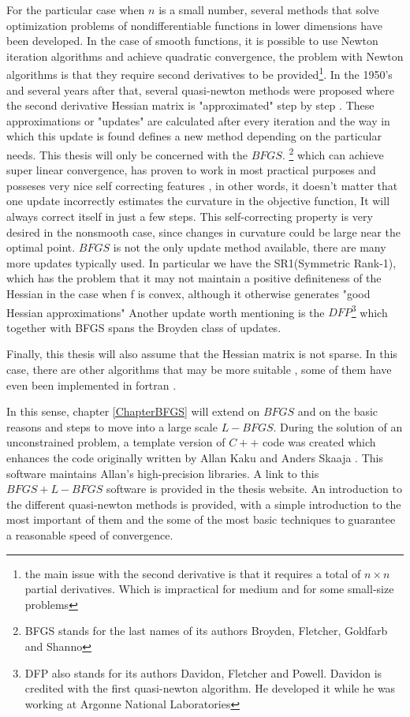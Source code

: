 For the particular case when $n$ is a small number, several methods that solve optimization problems of nondifferentiable functions in lower dimensions \citep{kiwiel85} have been developed.  In the case of smooth functions, it is possible to use Newton iteration algorithms and achieve quadratic convergence, the problem with Newton algorithms is that they require second derivatives to be provided\footnote{the main issue with the second derivative is that it requires a total of $n \times n$ partial derivatives.  Which is impractical for medium and for some small-size problems}.  In the 1950's and several years after that, several quasi-newton methods were proposed where the second derivative Hessian matrix is "approximated" step by step \citep{unconstrained}.  These approximations or "updates" are calculated after every iteration and the way in which this update is found defines a new method depending on the particular needs.  This thesis will only be concerned with the $BFGS$.  \footnote{BFGS stands for the last names of its authors Broyden, Fletcher, Goldfarb and Shanno} which can achieve super linear convergence, has proven to work in most practical purposes and posseses very nice self correcting features \citep{selfcorrecting}, in other words, it doesn't matter that one update incorrectly estimates the curvature in the objective function,  It will always correct itself in just a few steps.  This self-correcting property is very desired in the nonsmooth case, since changes in curvature could be large near the optimal point.   $BFGS$ is not the only update method available, there are many more updates typically used.  In particular we have the SR1(Symmetric Rank-1), which has the problem that it may not maintain a positive definiteness of the Hessian in the case when f is convex, although it otherwise generates "good Hessian approximations"\citep{nocedal} Another update worth mentioning is the $DFP$\footnote{DFP also stands for its authors Davidon, Fletcher and Powell.  Davidon is credited with the first quasi-newton algorithm.  He developed it while he was working at Argonne National Laboratories} which together with BFGS spans the Broyden class of updates.

Finally, this thesis will also assume that the Hessian matrix is not sparse.  In this case, there are other algorithms that may be more suitable \citep{Fletcher96computingsparse, sparse}, some of them have even been implemented in fortran \citep{lancelot}.

In this sense, chapter \ref{ChapterBFGS} will extend on $BFGS$ and on the basic reasons and steps to move into a large scale $L-BFGS$.  During the solution of an unconstrained problem, a template version of $C++$ code was created which enhances the code originally written by Allan Kaku and Anders Skaaja \citep{kaku}.  This software maintains Allan's high-precision libraries.  A link to this $BFGS+L-BFGS$ software is provided in the thesis website.  An introduction to the different quasi-newton methods is provided, with a simple introduction to the most important of them and the some of the most basic techniques to guarantee a reasonable speed of convergence.

